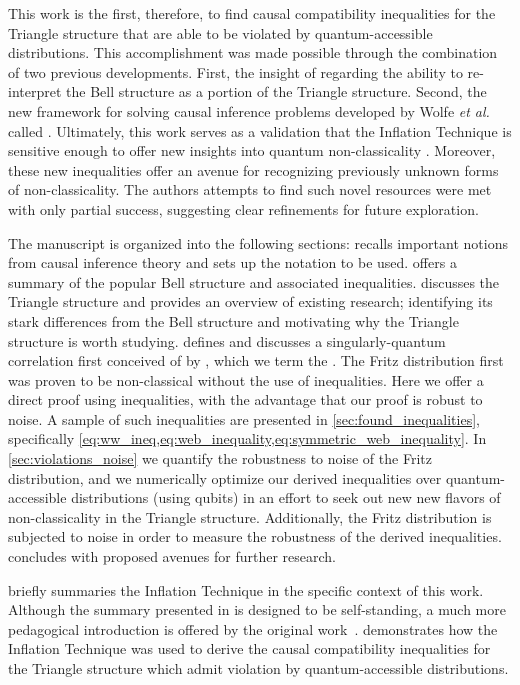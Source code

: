 \documentclass[aps, 10pt, english, twoside, pra, nofootinbib, tightenlines, longbibliography, superscriptaddress]{revtex4-1}
\begin{document}
    This work is the first, therefore, to find causal compatibility inequalities for the Triangle structure that are able to be violated by quantum-accessible distributions. This accomplishment was made possible through the combination of two previous developments. First, the insight of \citet{Fritz_2012} regarding the ability to re-interpret the Bell structure as a portion of the Triangle structure. Second, the new framework for solving causal inference problems developed by Wolfe \emph{et al.}~\cite{Inflation} called . Ultimately, this work serves as a validation that the Inflation Technique is sensitive enough to offer new insights into quantum non-classicality \cite{Navascues_2017}. Moreover, these new inequalities offer an avenue for recognizing previously unknown forms of non-classicality. The authors attempts to find such novel resources were met with only partial success, suggesting clear refinements for future exploration.

    The manuscript is organized into the following sections:  recalls important notions from causal inference theory and sets up the notation to be used.  offers a summary of the popular Bell structure and associated inequalities.  discusses the Triangle structure and provides an overview of existing research; identifying its stark differences from the Bell structure and motivating why the Triangle structure is worth studying.  defines and discusses a singularly-quantum correlation first conceived of by \citet{Fritz_2012}, which we term the . The Fritz distribution first was proven to be non-classical without the use of inequalities. Here we offer a direct proof using inequalities, with the advantage that our proof is robust to noise. A sample of such inequalities are presented in \cref{sec:found_inequalities}, specifically \cref{eq:ww_ineq,eq:web_inequality,eq:symmetric_web_inequality}. In \cref{sec:violations_noise} we quantify the robustness to noise of the Fritz distribution, and we numerically optimize our derived inequalities over quantum-accessible distributions (using qubits) in an effort to seek out new new flavors of non-classicality in the Triangle structure. Additionally, the Fritz distribution is subjected to noise in order to measure the robustness of the derived inequalities.  concludes with proposed avenues for further research.

     briefly summaries the Inflation Technique in the specific context of this work. Although the summary presented in  is designed to be self-standing, a much more pedagogical introduction is offered by the original work~\cite{Inflation}.  demonstrates how the Inflation Technique was used to derive the causal compatibility inequalities for the Triangle structure which admit violation by quantum-accessible distributions.
\end{document}
